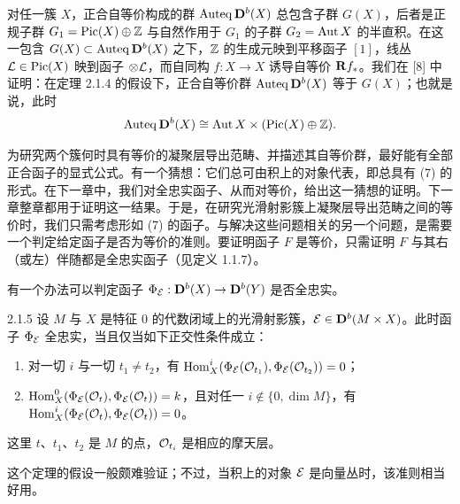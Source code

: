 对任一簇 $X$，正合自等价构成的群 $\operatorname{Auteq}\mathbf{D}^{b}(X)$ 总包含子群 $G(X)$，后者是正规子群 $G_1=\operatorname{Pic}(X)\oplus\mathbb{Z}$ 与自然作用于 $G_1$ 的子群 $G_2=\operatorname{Aut} X$ 的半直积。在这一包含 $G(X)\subset\operatorname{Auteq}\mathbf{D}^{b}(X)$ 之下，$\mathbb{Z}$ 的生成元映到平移函子 $[1]$，线丛 $\mathcal{L}\in\operatorname{Pic}(X)$ 映到函子 $\otimes\mathcal{L}$，而自同构 $f:X\to X$ 诱导自等价 $\mathbf{R} f_*$。我们在 [8] 中证明：在定理 2.1.4 的假设下，正合自等价群 $\operatorname{Auteq}\mathbf{D}^{b}(X)$ 等于 $G(X)$；也就是说，此时
\begin{equation*}
\operatorname{Auteq}\mathbf{D}^{b}(X)\cong\operatorname{Aut} X\times(\operatorname{Pic}(X)\oplus\mathbb{Z}).
\end{equation*}


为研究两个簇何时具有等价的凝聚层导出范畴、并描述其自等价群，最好能有全部正合函子的显式公式。有一个猜想：它们总可由积上的对象代表，即总具有 (7) 的形式。在下一章中，我们对全忠实函子、从而对等价，给出这一猜想的证明。下一章整章都用于证明这一结果。于是，在研究光滑射影簇上凝聚层导出范畴之间的等价时，我们只需考虑形如 (7) 的函子。与解决这些问题相关的另一个问题，是需要一个判定给定函子是否为等价的准则。要证明函子 $F$ 是等价，只需证明 $F$ 与其右（或左）伴随都是全忠实函子（见定义 1.1.7）。

有一个办法可以判定函子 $\Phi_{\mathcal{E}}:\mathbf{D}^{b}(X)\to\mathbf{D}^{b}(Y)$ 是否全忠实。

\begin{theorem}[{见 {[}7{]}}]{2.1.5}
设 $M$ 与 $X$ 是特征 $0$ 的代数闭域上的光滑射影簇，$\mathcal{E}\in\mathbf{D}^{b}(M\times X)$。此时函子 $\Phi_{\mathcal{E}}$ 全忠实，当且仅当如下正交性条件成立：
\begin{enumerate}[label=\arabic*),leftmargin=2.4em,itemsep=1pt,topsep=2pt]
\item 对一切 $i$ 与一切 $t_1\neq t_2$，有 $\operatorname{Hom}^{i}_{X}(\Phi_{\mathcal{E}}(\mathcal{O}_{t_1}),\Phi_{\mathcal{E}}(\mathcal{O}_{t_2}))=0$；
\item {\raggedright $\operatorname{Hom}^{0}_{X}(\Phi_{\mathcal{E}}(\mathcal{O}_{t}),\Phi_{\mathcal{E}}(\mathcal{O}_{t}))=k$，且对任一 $i\notin\{0,\dim M\}$，有 $\operatorname{Hom}^{i}_{X}(\Phi_{\mathcal{E}}(\mathcal{O}_{t}),\Phi_{\mathcal{E}}(\mathcal{O}_{t}))=0$。\par}
\end{enumerate}
\end{theorem}

这里 $t$、$t_1$、$t_2$ 是 $M$ 的点，$\mathcal{O}_{t_i}$ 是相应的摩天层。

这个定理的假设一般颇难验证；不过，当积上的对象 $\mathcal{E}$ 是向量丛时，该准则相当好用。

